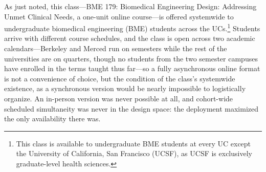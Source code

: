 As just noted, this class---BME 179: Biomedical Engineering Design:
Addressing Unmet Clinical Needs, a one-unit online course---is offered
systemwide to undergraduate biomedical engineering (BME) students across
the UCs.\footnote{This class is
available to undergraduate BME students at every UC except the University of
California, San Francisco (UCSF), as UCSF is exclusively graduate-level health
sciences.} Students arrive with different course schedules, and the class is open
across two academic calendars---Berkeley and Merced run on semesters while
the rest of the universities are on quarters, though no students from the
two semester campuses have enrolled in the terms taught thus far---so a
fully asynchronous online format is not a convenience of choice, but the
condition of the class's systemwide existence, as a synchronous version
would be nearly impossible to logistically organize. An
in-person version was never possible at all, and cohort-wide scheduled
simultaneity was never in the design space: the deployment maximized the only
availability there was.

